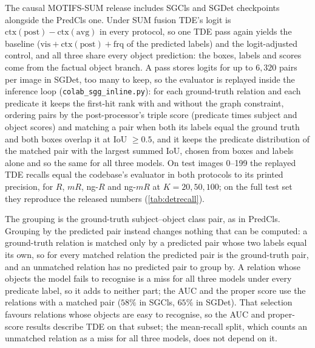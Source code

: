 The causal MOTIFS-SUM release includes SGCls and SGDet checkpoints alongside the PredCls one.
Under SUM fusion TDE's logit is $\mathrm{ctx(post)}-\mathrm{ctx(avg)}$ in every protocol, so one
TDE pass again yields the baseline ($\mathrm{vis}+\mathrm{ctx(post)}+\mathrm{frq}$ of the predicted
labels) and the logit-adjusted control, and all three share every object prediction: the boxes,
labels and scores come from the factual object branch. A pass stores logits for up to $6{,}320$
pairs per image in SGDet, too many to keep, so the evaluator is replayed inside the inference
loop (\texttt{colab\_sgg\_inline.py}): for each ground-truth relation and each predicate it keeps
the first-hit rank with and without the graph constraint, ordering pairs by the
post-processor's triple score (predicate times subject and object scores) and matching a pair
when both its labels equal the ground truth and both boxes overlap it at IoU $\ge0.5$, and it
keeps the predicate distribution of the matched pair with the largest summed IoU, chosen from
boxes and labels alone and so the same for all three models. On test images 0--199 the
replayed TDE recalls equal the codebase's evaluator in both protocols to its printed
precision, for $R$, $mR$, ng-$R$ and ng-$mR$ at $K=20,50,100$; on the full test set they
reproduce the released numbers (\cref{tab:detrecall}).

The grouping is the ground-truth subject--object class pair, as in PredCls. Grouping by the
predicted pair instead changes nothing that can be computed: a ground-truth relation is
matched only by a predicted pair whose two labels equal its own, so for every matched relation
the predicted pair is the ground-truth pair, and an unmatched relation has no predicted pair
to group by. A relation whose
objects the model fails to recognise is a miss for all three models under every predicate
label, so it adds to neither part; the AUC and the proper score use the relations with a
matched pair ($58\%$ in SGCls, $65\%$ in SGDet). That selection favours relations whose
objects are easy to recognise, so the AUC and proper-score results describe TDE on that
subset; the mean-recall split, which counts an unmatched relation as a miss for all three
models, does not depend on it.

